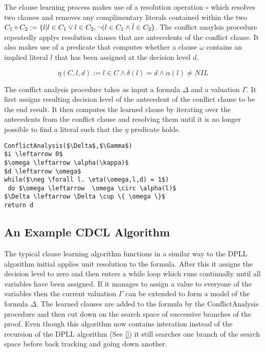 The clause learning process makes use of a resolution operation $\circ$ which resolves two clauses and removes any complimentary literals contained within the two $C_1 \circ C_2 := \{l | l \in C_1 \vee l \in C_2, \neg (l \in C_1 \wedge \overline{l} \in C_2 \}$. The conflict anaylsis procedure repeatedly applys resolution clauses that are antecedents of the conflict clause. It also makes use of a predicate that computes whether a clause $\omega$ contains an implied literal $l$ that has been assigned at the decision level $d$.

$$\eta(C,l,d) := l \in C \wedge \delta(l) = d \wedge \alpha(l) \neq NIL$$

The conflict analysis procedure takes as input a formula $\Delta$ and a valuation $\Gamma$. It first assigns resulting decision level of the antecedent of the conflict clause to be the end result. It then computes the learned clause by iterating over the antecedents from the conflict clause and resolving them until it is no longer possible to find a literal such that the $\eta$ predicate holds.

\begin{lstlisting}[caption = Conflict Analysis Procedure, mathescape]
ConflictAnalysis($\Delta$,$\Gamma$) 
$i \leftarrow 0$
$\omega \leftarrow \alpha(\kappa)$
$d \leftarrow \omega$
while($\neg \forall l. \eta(\omega,l,d) = 1$)
 do $\omega \leftarrow  \omega \circ \alpha(l)$
$\Delta \leftarrow \Delta \cup \{ \omega \}$
return d
\end{lstlisting}



\subsection*{An Example CDCL Algorithm}

The typical clause learning algorithm functions in a similar way to the DPLL algorithm initial applies unit resolution to the formula. After this it assigns the decision level to zero and then enters a while loop which runs continually until all variables have been assigned. If it manages to assign a value to everyone of the variables then the current valuation $\Gamma$ can be extended to form a model of the formula $\Delta$. The learned clauses are added to the formula by the $\mathrm{ConflictAnalysis}$ procedure and then cut down on the search space of successive branches of the proof. Even though this algorithm now contains interation instead of the recursion of the DPLL algorithm (See \ref{})  it still searches one branch of the search space before back tracking and going down another.




